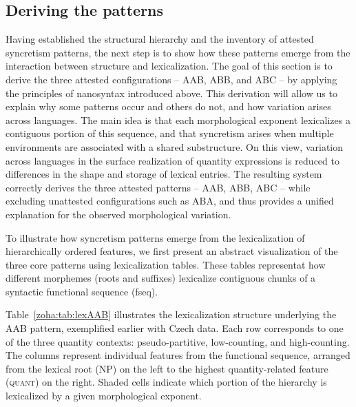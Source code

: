 \documentclass[output=paper,colorlinks,citecolor=brown
]{langscibook}
\begin{document}
\subsection{Deriving the patterns}\label{zoha:sec:deriving}

Having established the structural hierarchy and the inventory of attested syncretism patterns, the next step is to show how these patterns emerge from the interaction between structure and lexicalization.
The goal of this section is to derive the three attested configurations – AAB, ABB, and ABC – by applying the principles of nanosyntax introduced above. This derivation will allow us to explain why some patterns occur and others do not, and how variation arises across languages. The main idea is that each morphological exponent lexicalizes a contiguous portion of this sequence, and that syncretism arises when multiple environments are associated with a shared substructure. On this view, variation across languages in the surface realization of quantity expressions is reduced to differences in the shape and storage of lexical entries. The resulting system correctly derives the three attested patterns -- AAB, ABB, ABC -- while excluding unattested configurations such as ABA, and thus provides a unified explanation for the observed morphological variation.

To illustrate how syncretism patterns emerge from the lexicalization of hierarchically ordered features, we first present an abstract visualization of the three core patterns using lexicalization tables. These tables representat how different morphemes (roots and suffixes) lexicalize contiguous chunks of a syntactic functional sequence (fseq).

Table~\ref{zoha:tab:lexAAB} illustrates the lexicalization structure underlying the AAB pattern, exemplified earlier with Czech data. Each row corresponds to one of the three quantity contexts: pseudo-partitive, low-counting, and high-counting. The columns represent individual features from the functional sequence, arranged from the lexical root (\textsc{NP}) on the left to the highest quantity-related feature (\textsc{quant}) on the right. Shaded cells indicate which portion of the hierarchy is lexicalized by a given morphological exponent.
\end{document}
